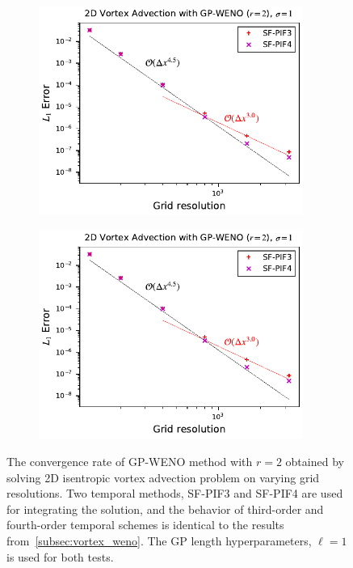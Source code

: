\begin{figure}
    \centering
    \begin{subfigure}{70mm}
        \centering
        \includegraphics[width=0.95\textwidth]{fig/gp2_vortex_error_sigma1}
    \end{subfigure}
    \begin{subfigure}{70mm}
        \centering
        \includegraphics[width=0.95\textwidth]{fig/gp2_vortex_error_sigma1}
    \end{subfigure}
    \caption{The convergence rate of GP-WENO method with \( r=2 \) obtained by solving
        2D isentropic vortex advection problem on varying grid resolutions.
        Two temporal methods, SF-PIF3 and SF-PIF4 are used for integrating the solution,
        and the behavior of third-order and fourth-order temporal schemes
        is identical to the results from~\cref{subsec:vortex_weno}.
        The GP length hyperparameters, \( \ell = 1 \) is used for both tests.
    }\label{fig:gp_vortex_convergence}
\end{figure}

